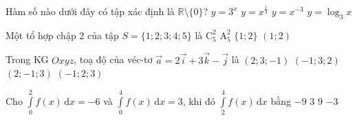 \begin{ex}%
	Hàm số nào dưới đây có tập xác định là $\mathbb{R} \setminus \{0\}$?
	\choice
	{$y=3^x$}
	{$y=x^{\tfrac{1}{3}}$}
	{\True $y=x^{-3}$}
	{$y=\log _3 x$}
\end{ex}

\begin{ex}%
	Một tổ hợp chập $2$ của tập $S=\{1;2;3;4;5\}$ là
	\choice
	{$\mathrm{C}_5^2$}
	{$\mathrm{A}_5^2$}
	{\True $\{1;2\}$}
	{$(1;2)$}
\end{ex}

\begin{ex}%
	Trong KG $Oxyz$, toạ độ của véc-tơ $\overrightarrow{a}=2 \overrightarrow{i}+3 \overrightarrow{k}-\overrightarrow{j}$ là
	\choice
	{$(2;3;-1)$}
	{$(-1;3;2)$}
	{\True $(2;-1;3)$}
	{$(-1;2;3)$}
\end{ex}

\begin{ex}%
	Cho $\displaystyle\int\limits_0^2 f(x) \mathrm{\,d}x=-6$ và $\displaystyle\int\limits_0^4 f(x)\mathrm{\,d}x=3$, khi đó $\displaystyle\int\limits_2^4 f(x)\mathrm{\,d}x$ bằng
	\choice
	{$-9$}
	{$3$}
	{\True $9$}
	{$-3$}
\end{ex}


